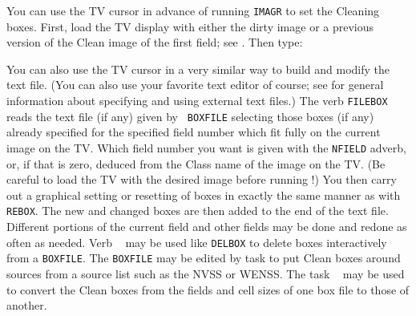      You can use the TV cursor in advance of running {\tt IMAGR} to
set the Cleaning boxes.  First, load the TV display with either the
dirty image or a previous version of the Clean image of the first
field; see .  Then type:

     You can also use the TV cursor in a very similar way to build and
modify the {\tt {}} text file.  (You can
also use your favorite text editor of course; see  for
general information about specifying and using external text files.)
The verb {\tt FILEBOX} reads the text file (if any) given by {\tt
BOXFILE} selecting those boxes (if any) already specified for the
specified field number which fit fully on the current image on the
TV\@.  Which field number you want is given with the {\tt NFIELD}
adverb, or, if that is zero, deduced from the Class name of the image
on the TV\@.  (Be careful to load the TV with the desired image before
running {\tt {}}\@!)  You then carry out a graphical
setting or resetting of boxes in exactly the same manner as with
{\tt REBOX}\@.  The new and changed boxes are then added to the end of
the text file.  Different portions of the current field and other
fields may be done and redone as often as needed.  Verb {\tt
{}} may be used like {\tt DELBOX} to delete boxes
interactively from a {\tt BOXFILE}\@.  The {\tt BOXFILE} may be edited
by task {\tt {}} to put Clean boxes around sources
from a source list such as the NVSS or WENSS\@.  The task {\tt
{}} may be used to convert the Clean boxes from the fields
and cell sizes of one box file to those of another.

